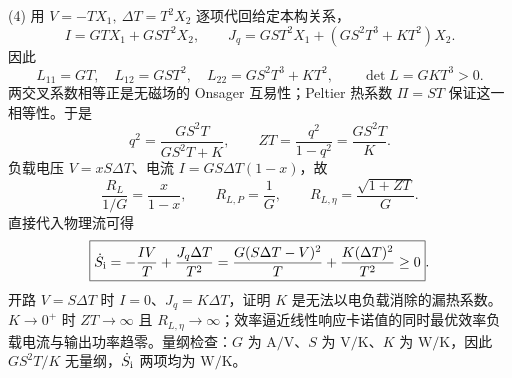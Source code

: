 (4) 用 \(V=-TX_1,\ \Delta T=T^2X_2\) 逐项代回给定本构关系，
\[
I=GTX_1+GST^2X_2,\qquad
J_q=GST^2X_1+(GS^2T^3+KT^2)X_2.
\]
因此
\[
\boxed{L_{11}=GT,\quad L_{12}=GST^2,\quad
L_{22}=GS^2T^3+KT^2},\qquad
\boxed{\det L=GKT^3>0}.
\]
两交叉系数相等正是无磁场的 Onsager 互易性；Peltier 热系数 \(\Pi=ST\) 保证这一相等性。于是
\[
q^2=\frac{GS^2T}{GS^2T+K},\qquad
\boxed{ZT=\frac{q^2}{1-q^2}=\frac{GS^2T}{K}}.
\]
负载电压 \(V=xS\Delta T\)、电流 \(I=GS\Delta T(1-x)\)，故
\[
\frac{R_L}{1/G}=\frac{x}{1-x},\qquad
\boxed{R_{L,P}=\frac1G},\qquad
\boxed{R_{L,\eta}=\frac{\sqrt{1+ZT}}G}.
\]
直接代入物理流可得
\[
\boxed{\dot S_{\rm i}=-\frac{IV}{T}+\frac{J_q\Delta T}{T^2}
=\frac{G(S\Delta T-V)^2}{T}+\frac{K(\Delta T)^2}{T^2}\ge0}.
\]
开路 \(V=S\Delta T\) 时 \(I=0\)、\(J_q=K\Delta T\)，证明 \(K\) 是无法以电负载消除的漏热系数。\(K\to0^+\) 时 \(ZT\to\infty\) 且 \(R_{L,\eta}\to\infty\)；效率逼近线性响应卡诺值的同时最优效率负载电流与输出功率趋零。量纲检查：\(G\) 为 \(\mathrm{A/V}\)、\(S\) 为 \(\mathrm{V/K}\)、\(K\) 为 \(\mathrm{W/K}\)，因此 \(GS^2T/K\) 无量纲，\(\dot S_{\rm i}\) 两项均为 \(\mathrm{W/K}\)。